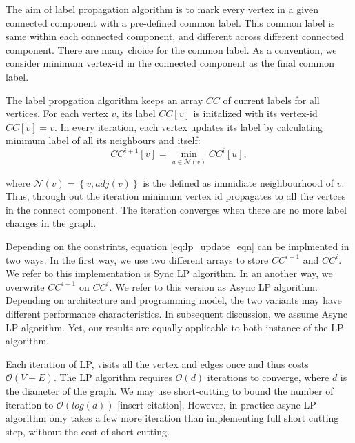 \begin{table}



\end{table}

The aim of label propagation algorithm is to mark every vertex in
a given connected component with a pre-defined common label. This
common label is same within each connected component, and different
across different connected component. There are many choice for the
common label. As a convention, we consider minimum vertex-id in the
connected component as the final common label. 

The label propgation algorithm keeps an array $CC$ of current labels
for all vertices. For each vertex $v$, its label $CC[v]$ is initalized
with its vertex-id $CC[v]=v$. In every iteration, each vertex updates
its label by calculating minimum label of all its neighbours and itself:
\begin{equation}
CC^{i+1}[v]=\min_{u\in\mathcal{N}(v)}CC^{i}[u],\label{eq:lp_update_eqn}
\end{equation}

where $\mathcal{N}(v)=\left\{ v,adj(v)\right\} $ is the defined as
immidiate neighbourhood of $v$. Thus, through out the iteration minimum
vertex id propagates to all the vertces in the connect component.
The iteration converges when there are no more label changes in the
graph. 

Depending on the constrints, equation \ref{eq:lp_update_eqn} can
be implmented in two ways. In the first way, we use two different
arrays to store $CC^{i+1}$ and $CC^{i}$. We refer to this implementation
is Sync LP algorithm. In an another way, we overwrite $CC^{i+1}$
on $CC^{i}$. We refer to this version as Async LP algorithm. Depending
on architecture and programming model, the two variants may have different
performance characteristics. In subsequent discussion, we assume Async
LP algorithm. Yet, our results are equally applicable to both instance
of the LP algorithm.

Each iteration of LP, visits all the vertex and edges once and thus
costs $\mathcal{O}(V+E)$. The LP algorithm requires $\mathcal{O}(d)$
iterations to converge, where $d$ is the diameter of the graph. We
may use short-cutting to bound the number of iteration to $\mathcal{O}(log(d))$
{[}insert citation{]}. However, in practice async LP algorithm only
takes a few more iteration than implementing full short cutting step,
without the cost of short cutting. 
